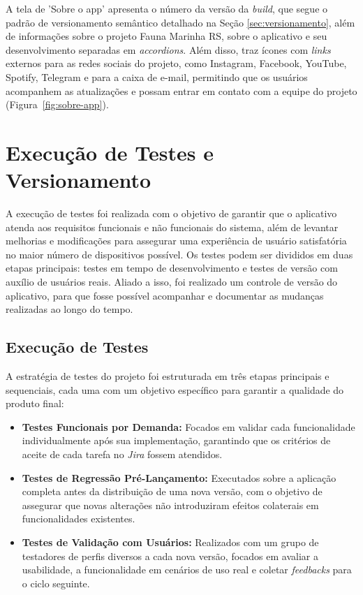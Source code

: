 A tela de 'Sobre o app' apresenta o número da versão da \textit{build}, que segue o padrão de versionamento semântico detalhado na Seção \ref{sec:versionamento}, além de informações sobre o projeto Fauna Marinha RS, sobre o aplicativo e seu desenvolvimento separadas em \textit{accordions}. Além disso, traz ícones com \textit{links} externos para as redes sociais do projeto, como Instagram, Facebook, YouTube, Spotify, Telegram e para a caixa de e-mail, permitindo que os usuários acompanhem as atualizações e possam entrar em contato com a equipe do projeto (Figura~\ref{fig:sobre-app}).

\section{Execução de Testes e Versionamento}
A execução de testes foi realizada com o objetivo de garantir que o aplicativo atenda aos requisitos funcionais e não funcionais do sistema, além de levantar melhorias e modificações para assegurar uma experiência de usuário satisfatória no maior número de dispositivos possível. Os testes podem ser divididos em duas etapas principais: testes em tempo de desenvolvimento e testes de versão com auxílio de usuários reais. Aliado a isso, foi realizado um controle de versão do aplicativo, para que fosse possível acompanhar e documentar as mudanças realizadas ao longo do tempo.

\subsection{Execução de Testes}

A estratégia de testes do projeto foi estruturada em três etapas principais e sequenciais, cada uma com um objetivo específico para garantir a qualidade do produto final:

\begin{itemize}
\item \textbf{Testes Funcionais por Demanda:} Focados em validar cada funcionalidade individualmente após sua implementação, garantindo que os critérios de aceite de cada tarefa no \textit{Jira} fossem atendidos.
\item \textbf{Testes de Regressão Pré-Lançamento:} Executados sobre a aplicação completa antes da distribuição de uma nova versão, com o objetivo de assegurar que novas alterações não introduziram efeitos colaterais em funcionalidades existentes.
\item \textbf{Testes de Validação com Usuários:} Realizados com um grupo de testadores de perfis diversos a cada nova versão, focados em avaliar a usabilidade, a funcionalidade em cenários de uso real e coletar \textit{feedbacks} para o ciclo seguinte.
\end{itemize}

